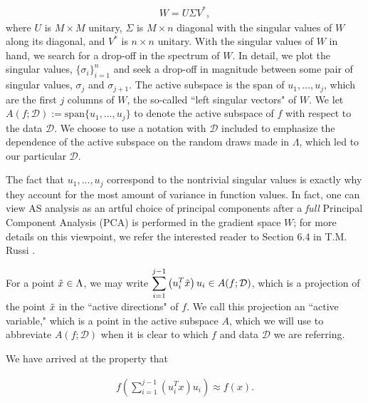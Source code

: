 \documentclass{report}
\newcommand{\ds}{\displaystyle}
\begin{document}
\begin{eqnarray}
W=U\Sigma V^*,
\end{eqnarray} where $U$ is $M \times M$ unitary, $\Sigma$ is $M \times n$ diagonal with the singular values of $W$ along its diagonal, and $V^*$ is $n \times n$ unitary. With the singular values of $W$ in hand, we search for a drop-off in the spectrum of $W$. In detail, we plot the singular values, $\{\sigma_i\}_{i=1}^n$ and seek a drop-off in magnitude between some pair of singular values, $\sigma_{j}$ and $\sigma_{j+1}$. The active subspace is the span of $u_1,\ldots,u_{j}$, which are the first $j$ columns of $W$, the so-called ``left singular vectors" of $W$. We let $A\left(f;\mathcal{D}\right):=\text{span}\{u_1,\ldots,u_{j}\}$ to denote the active subspace of $f$ with respect to the data $\mathcal{D}$. We choose to use a notation with $\mathcal{D}$ included to emphasize the dependence of the active subspace on the random draws made in $\Lambda$, which led to our particular $\mathcal{D}$.

\vspace{.25cm}

\noindent The fact that $u_1,\ldots,u_{j}$ correspond to the nontrivial singular values is exactly why they account for the most amount of variance in function values. In fact, one can view AS analysis as an artful choice of principal components after a \textit{full} Principal Component Analysis (PCA) is performed in the gradient space $W$; for more details on this viewpoint, we refer the interested reader to Section 6.4 in T.M. Russi \cite{Russi}.

\vspace{.25cm}

\noindent For a point $\Tilde{x} \in \Lambda$, we may write $\ds \sum_{i=1}^{j-1}\left( u_i^T \Tilde{x}\right)u_i \in A(f;\mathcal{D})$, which is a projection of the point $\Tilde{x}$ in the ``active directions" of $f$. We call this projection an ``active variable," which is a point in the active subspace $A$, which we will use to abbreviate $A(f;\mathcal{D})$ when it is clear to which $f$ and data $\mathcal{D}$ we are referring.

\vspace{.25cm}

We have arrived at the property that 

\begin{eqnarray}
f\left(\sum_{i=1}^{j-1} \left(u_i^T x\right) u_i\right) \approx f(x).
\end{eqnarray} 
\end{document}
